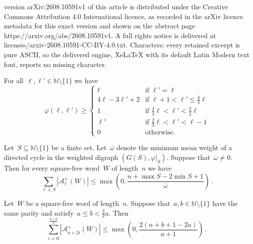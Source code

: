 \documentclass[10pt,a4paper]{amsart}
\newcommand\N{\mathbb{N}}
\newcommand{\abs}[1]{\mathopen{}\left\lvert#1\right\rvert\mathclose{}}
\newcommand{\bw}{\overline \omega}
\newcommand{\cA}{\mathcal A}
\newcommand{\f}{\varphi}
\newcommand{\sm}{\setminus}
\newcommand{\subs}{\subseteq}
\newcommand{\w}{\f\vert_S}
\begin{document}
version arXiv:2608.10591v1 of this article is distributed under the Creative Commons Attribution 4.0 International licence, as recorded in the arXiv licence metadata for this exact version and shown on the abstract page https://arxiv.org/abs/2608.10591v1. A full rights notice is delivered at licenses/arxiv-2608.10591-CC-BY-4.0.txt. Characters: every retained excerpt is pure ASCII, so the delivered engine, XeLaTeX with its default Latin Modern text font, reports no missing character.
	\begin{lemma} \label{lem:gap-lower-bound}
		For all~$\ell,\ell'\in\N\sm\{1\}$ we have
		\begin{equation*}
			\f(\ell,\ell') \ge
			\begin{cases}
				\ell &\textrm{if } \ell'=\ell \\
				4\ell-3\ell'+2 &\textrm{if } \ell+1<\ell'\le\frac{4}{3}\ell \\
				1 &\textrm{if } \frac{4}{3}\ell<\ell'<\frac{3}{2}\ell \\
				\ell' &\textrm{if } \frac{2}{3}\ell<\ell'<\ell-1 \\
				0 &\textrm{otherwise.}
			\end{cases}
		\end{equation*}
	\end{lemma}

	\begin{lemma} \label{lem:bound-min-mean-weight-cycle}
		Let~$S\subs\N\sm\{1\}$ be a finite set. Let~$\bw$ denote the minimum mean weight of a directed cycle in the weighted digraph $(G(S),\w)$. Suppose that~$\bw\ne0$. Then for every square-free word~$W$ of length~$n$ we have
		\[ \sum_{\ell\in S}\abs{\cA^{+}_\ell(W)}\le \max\!\left(0,\frac{n+\max S-2\min S+1}{\bw}\right)\,. \]
	\end{lemma}

	\begin{lemma}\label{lem:bound-same-parity-twothirds}
		Let~$W$ be a square-free word of length~$n$. Suppose that~$a,b\in\N\setminus\{1\}$ have the same parity and satisfy~$a\le b<\frac{3}{2}a$. Then
		\[\sum_{i=0}^{\frac{b-a}{2}}\abs{\cA^{+}_{a+2i}(W)}\le \max\!\left(0,\frac{2(n+b+1-2a)}{a+1}\right)\,.\]
	\end{lemma}
\end{document}
